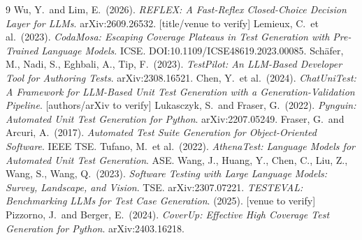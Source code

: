 \documentclass[11pt]{article}
\begin{document}
\begin{thebibliography}{9}
 Wu, Y.\ and Lim, E.\ (2026). \emph{REFLEX: A Fast-Reflex Closed-Choice Decision Layer for LLMs}. arXiv:2609.26532. \textcolor{warn}{[title/venue to verify]}
 Lemieux, C.\ et al.\ (2023). \emph{CodaMosa: Escaping Coverage Plateaus in Test Generation with Pre-Trained Language Models}. ICSE. DOI:10.1109/ICSE48619.2023.00085.
 Sch\"afer, M., Nadi, S., Eghbali, A., Tip, F.\ (2023). \emph{TestPilot: An LLM-Based Developer Tool for Authoring Tests}. arXiv:2308.16521.
 Chen, Y.\ et al.\ (2024). \emph{ChatUniTest: A Framework for LLM-Based Unit Test Generation with a Generation-Validation Pipeline}. \textcolor{warn}{[authors/arXiv to verify]}
 Lukasczyk, S.\ and Fraser, G.\ (2022). \emph{Pynguin: Automated Unit Test Generation for Python}. arXiv:2207.05249.
 Fraser, G.\ and Arcuri, A.\ (2017). \emph{Automated Test Suite Generation for Object-Oriented Software}. IEEE TSE.
 Tufano, M.\ et al.\ (2022). \emph{AthenaTest: Language Models for Automated Unit Test Generation}. ASE.
 Wang, J., Huang, Y., Chen, C., Liu, Z., Wang, S., Wang, Q.\ (2023). \emph{Software Testing with Large Language Models: Survey, Landscape, and Vision}. TSE. arXiv:2307.07221.
 \emph{TESTEVAL: Benchmarking LLMs for Test Case Generation}. (2025). \textcolor{warn}{[venue to verify]}
 Pizzorno, J.\ and Berger, E.\ (2024). \emph{CoverUp: Effective High Coverage Test Generation for Python}. arXiv:2403.16218.
\end{thebibliography}
\end{document}
